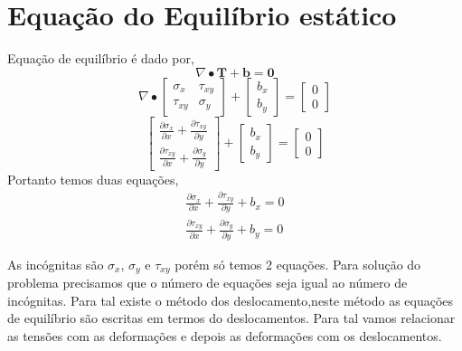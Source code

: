\section{Equação do Equilíbrio estático}

Equação de equilíbrio é dado por,
%
\begin{equation}
\nabla \bullet \pmb{T} + \pmb{b} = \pmb{0}	
\end{equation}
%
\begin{equation}
	\nabla \bullet \begin{bmatrix}
		\sigma_x	& \tau_{xy}\\ 
		\tau_{xy}   & \sigma_y
	\end{bmatrix}
    +
    \begin{bmatrix}
    b_x	\\
    b_y 
    \end{bmatrix}
     = 
    \begin{bmatrix}
     	0	\\
     	0 
    \end{bmatrix}
\end{equation}
%
\begin{equation}
	\begin{bmatrix}
		\frac{\partial \sigma_x}{\partial x}	+ \frac{\partial \tau_{xy}}{\partial y}\\ 
		\frac{\partial \tau_{xy}}{\partial x} + \frac{\partial \sigma_y}{\partial y}
	\end{bmatrix}
	+
	\begin{bmatrix}
		b_x	\\
		b_y 
	\end{bmatrix}
	= 
	\begin{bmatrix}
		0	\\
		0 
	\end{bmatrix}
\end{equation}
%
Portanto temos duas equações,
%
\begin{equation}
	\begin{split}
	\frac{\partial \sigma_x}{\partial x}	+ \frac{\partial \tau_{xy}}{\partial y} + b_x = 0\\
    \frac{\partial \tau_{xy}}{\partial x} + \frac{\partial \sigma_y}{\partial y} + b_y = 0
	\end{split}
	\label{eq3:equilibrio}
\end{equation}
%

As incógnitas são $\sigma_x$, $\sigma_y$ e $\tau_{xy}$ porém só temos 2 equações. Para solução do problema precisamos que o número de equações seja igual ao número de incógnitas. Para tal existe o método dos deslocamento,neste método  as equações de equilíbrio são escritas em termos do deslocamentos. Para tal vamos relacionar as tensões com as deformações e depois as deformações com os deslocamentos.

